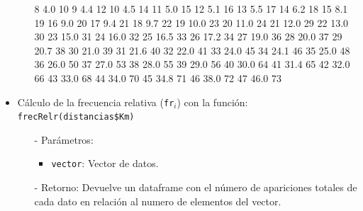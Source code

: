 \documentclass[a4paper, 12pt]{article}
\begin{document}
\begin{itemize}
\begin{itemize}
\begin{Schunk}
\begin{Soutput}
8    4.0          10
9    4.4          12
10   4.5          14
11   5.0          15
12   5.1          16
13   5.5          17
14   6.2          18
15   8.1          19
16   9.0          20
17   9.4          21
18   9.7          22
19  10.0          23
20  11.0          24
21  12.0          29
22  13.0          30
23  15.0          31
24  16.0          32
25  16.5          33
26  17.2          34
27  19.0          36
28  20.0          37
29  20.7          38
30  21.0          39
31  21.6          40
32  22.0          41
33  24.0          45
34  24.1          46
35  25.0          48
36  26.0          50
37  27.0          53
38  28.0          55
39  29.0          56
40  30.0          64
41  31.4          65
42  32.0          66
43  33.0          68
44  34.0          70
45  34.8          71
46  38.0          72
47  46.0          73
\end{Soutput}
\end{Schunk}
		\end{itemize}
		
		\item Cálculo de la frecuencia relativa (\texttt{fr$_{i}$}) con la función: \texttt{frecRelr(distancias\$Km)}
		\begin{itemize}
			\item[-] Parámetros: 
			\begin{itemize}
				\item \texttt{vector}: Vector de datos.
			\end{itemize}
			
			\item[-] Retorno: Devuelve un dataframe con el número de apariciones totales de cada dato en relación al numero de elementos del vector. 
			

\end{itemize}
\end{itemize}
\end{document}
